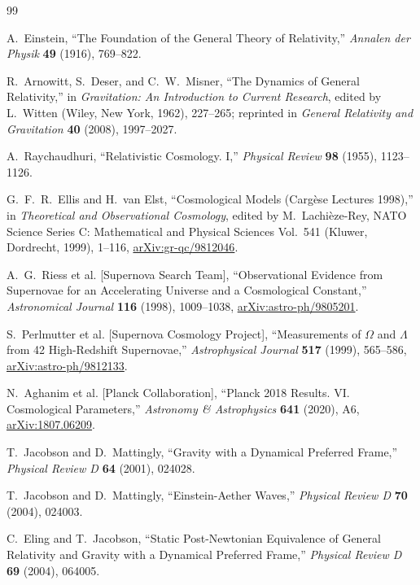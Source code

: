 \begin{thebibliography}{99}

A.~Einstein,
``The Foundation of the General Theory of Relativity,''
\emph{Annalen der Physik} \textbf{49} (1916), 769--822.

R.~Arnowitt, S.~Deser, and C.~W.~Misner,
``The Dynamics of General Relativity,''
in \emph{Gravitation: An Introduction to Current Research},
edited by L.~Witten (Wiley, New York, 1962), 227--265;
reprinted in \emph{General Relativity and Gravitation} \textbf{40} (2008), 1997--2027.

A.~Raychaudhuri,
``Relativistic Cosmology. I,''
\emph{Physical Review} \textbf{98} (1955), 1123--1126.

G.~F.~R.~Ellis and H.~van Elst,
``Cosmological Models (Carg\`ese Lectures 1998),''
in \emph{Theoretical and Observational Cosmology},
edited by M.~Lachi\`eze-Rey,
NATO Science Series C: Mathematical and Physical Sciences Vol.~541
(Kluwer, Dordrecht, 1999), 1--116,
\href{https://arxiv.org/abs/gr-qc/9812046}{arXiv:gr-qc/9812046}.

A.~G.~Riess et al. [Supernova Search Team],
``Observational Evidence from Supernovae for an Accelerating Universe and a Cosmological Constant,''
\emph{Astronomical Journal} \textbf{116} (1998), 1009--1038,
\href{https://arxiv.org/abs/astro-ph/9805201}{arXiv:astro-ph/9805201}.

S.~Perlmutter et al. [Supernova Cosmology Project],
``Measurements of $\Omega$ and $\Lambda$ from 42 High-Redshift Supernovae,''
\emph{Astrophysical Journal} \textbf{517} (1999), 565--586,
\href{https://arxiv.org/abs/astro-ph/9812133}{arXiv:astro-ph/9812133}.

N.~Aghanim et al. [Planck Collaboration],
``Planck 2018 Results. VI. Cosmological Parameters,''
\emph{Astronomy \& Astrophysics} \textbf{641} (2020), A6,
\href{https://arxiv.org/abs/1807.06209}{arXiv:1807.06209}.

T.~Jacobson and D.~Mattingly,
``Gravity with a Dynamical Preferred Frame,''
\emph{Physical Review D} \textbf{64} (2001), 024028.

T.~Jacobson and D.~Mattingly,
``Einstein-Aether Waves,''
\emph{Physical Review D} \textbf{70} (2004), 024003.

C.~Eling and T.~Jacobson,
``Static Post-Newtonian Equivalence of General Relativity and Gravity with a Dynamical Preferred Frame,''
\emph{Physical Review D} \textbf{69} (2004), 064005.


\end{thebibliography}
